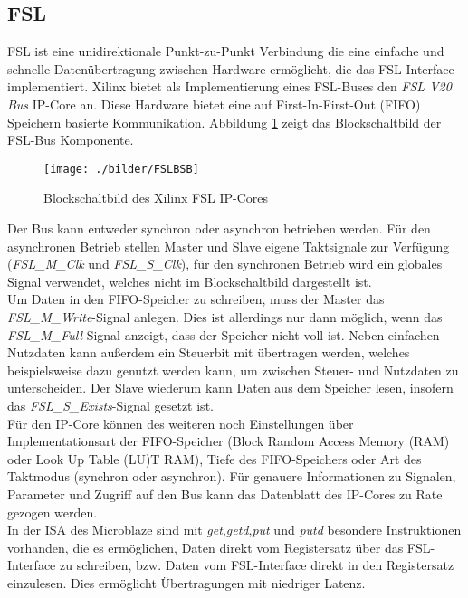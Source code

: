 \subsection{FSL}
FSL ist eine unidirektionale Punkt-zu-Punkt Verbindung die eine einfache und schnelle Datenübertragung zwischen Hardware ermöglicht, die das FSL Interface implementiert. Xilinx bietet als Implementierung eines FSL-Buses den \textit{FSL V20 Bus} IP-Core an. Diese Hardware bietet eine auf First-In-First-Out (FIFO) Speichern basierte Kommunikation. Abbildung \ref{fig:FSLBSB} zeigt das Blockschaltbild der FSL-Bus Komponente.\\
\begin{figure}[th!]
\centering
\texttt{[image: ./bilder/FSLBSB]}
\caption{Blockschaltbild des Xilinx FSL IP-Cores}
\label{fig:FSLBSB}
\end{figure}
\noindent
Der Bus kann entweder synchron oder asynchron betrieben werden. Für den asynchronen Betrieb stellen Master und Slave eigene Taktsignale zur Verfügung (\textit{FSL\_M\_Clk} und \textit{FSL\_S\_Clk}), für den synchronen Betrieb wird ein globales Signal verwendet, welches nicht im Blockschaltbild dargestellt ist.\\
Um Daten in den FIFO-Speicher zu schreiben, muss der Master das \textit{FSL\_M\_Write}-Signal anlegen. Dies ist allerdings nur dann möglich, wenn das \textit{FSL\_M\_Full}-Signal anzeigt, dass der Speicher nicht voll ist. Neben einfachen Nutzdaten kann außerdem ein Steuerbit mit übertragen werden, welches beispielsweise dazu genutzt werden kann, um zwischen Steuer- und Nutzdaten zu unterscheiden. Der Slave wiederum kann Daten aus dem Speicher lesen, insofern das \textit{FSL\_S\_Exists}-Signal gesetzt ist.\\
Für den IP-Core können des weiteren noch Einstellungen über Implementationsart der FIFO-Speicher (Block Random Access Memory (RAM) oder Look Up Table (LU)T RAM), Tiefe des FIFO-Speichers oder Art des Taktmodus (synchron oder asynchron). Für genauere Informationen zu Signalen, Parameter und Zugriff auf den Bus kann das Datenblatt des IP-Cores zu Rate gezogen werden.\\ %
In der ISA des Microblaze sind mit \textit{get},\textit{getd},\textit{put} und \textit{putd} besondere Instruktionen vorhanden, die es ermöglichen, Daten direkt vom Registersatz über das FSL-Interface zu schreiben, bzw. Daten vom FSL-Interface direkt in den Registersatz einzulesen. Dies ermöglicht Übertragungen mit niedriger Latenz.
